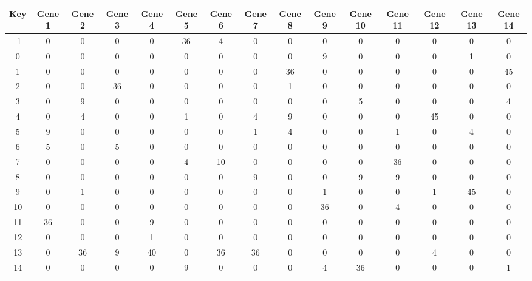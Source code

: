 \begin{tabular}{|c|c|c|c|c|c|c|c|c|c|c|c|c|c|c|}
\hline
Key & Gene 1 & Gene 2 & Gene 3 & Gene 4 & Gene 5 & Gene 6 & Gene 7 & Gene 8 & Gene 9 & Gene 10 & Gene 11 & Gene 12 & Gene 13 & Gene 14 \\
\hline
-1 & 0 & 0 & 0 & 0 & 36 & 4 & 0 & 0 & 0 & 0 & 0 & 0 & 0 & 0 \\
0 & 0 & 0 & 0 & 0 & 0 & 0 & 0 & 0 & 9 & 0 & 0 & 0 & 1 & 0 \\
1 & 0 & 0 & 0 & 0 & 0 & 0 & 0 & 36 & 0 & 0 & 0 & 0 & 0 & 45 \\
2 & 0 & 0 & 36 & 0 & 0 & 0 & 0 & 1 & 0 & 0 & 0 & 0 & 0 & 0 \\
3 & 0 & 9 & 0 & 0 & 0 & 0 & 0 & 0 & 0 & 5 & 0 & 0 & 0 & 4 \\
4 & 0 & 4 & 0 & 0 & 1 & 0 & 4 & 9 & 0 & 0 & 0 & 45 & 0 & 0 \\
5 & 9 & 0 & 0 & 0 & 0 & 0 & 1 & 4 & 0 & 0 & 1 & 0 & 4 & 0 \\
6 & 5 & 0 & 5 & 0 & 0 & 0 & 0 & 0 & 0 & 0 & 0 & 0 & 0 & 0 \\
7 & 0 & 0 & 0 & 0 & 4 & 10 & 0 & 0 & 0 & 0 & 36 & 0 & 0 & 0 \\
8 & 0 & 0 & 0 & 0 & 0 & 0 & 9 & 0 & 0 & 9 & 9 & 0 & 0 & 0 \\
9 & 0 & 1 & 0 & 0 & 0 & 0 & 0 & 0 & 1 & 0 & 0 & 1 & 45 & 0 \\
10 & 0 & 0 & 0 & 0 & 0 & 0 & 0 & 0 & 36 & 0 & 4 & 0 & 0 & 0 \\
11 & 36 & 0 & 0 & 9 & 0 & 0 & 0 & 0 & 0 & 0 & 0 & 0 & 0 & 0 \\
12 & 0 & 0 & 0 & 1 & 0 & 0 & 0 & 0 & 0 & 0 & 0 & 0 & 0 & 0 \\
13 & 0 & 36 & 9 & 40 & 0 & 36 & 36 & 0 & 0 & 0 & 0 & 4 & 0 & 0 \\
14 & 0 & 0 & 0 & 0 & 9 & 0 & 0 & 0 & 4 & 36 & 0 & 0 & 0 & 1 \\
\hline
\end{tabular}